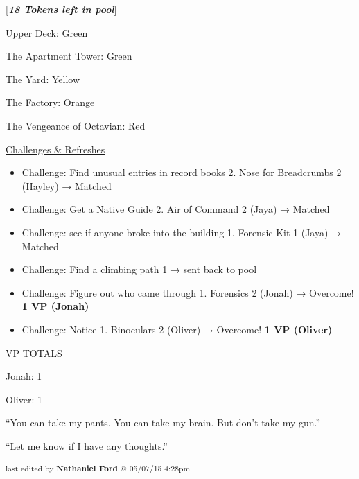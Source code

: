 {[}\textit{\textbf{18 Tokens left in pool}}{]}



Upper Deck: Green

The Apartment Tower: Green

The Yard: Yellow

The Factory: Orange

The Vengeance of Octavian: Red



\underline{  {\LARGE Challenges \& Refreshes }  }



\begin{itemize}
\item Challenge: Find unusual entries in record books 2.  Nose for Breadcrumbs 2 (Hayley) → Matched
\item Challenge: Get a Native Guide 2.  Air of Command 2 (Jaya) → Matched
\item Challenge: see if anyone broke into the building 1. Forensic Kit 1 (Jaya) → Matched
\item Challenge: Find a climbing path 1 → sent back to pool
\item Challenge: Figure out who came through 1.  Forensics 2 (Jonah) → Overcome! \textbf{1 VP (Jonah)}
\item Challenge: Notice 1.  Binoculars 2 (Oliver) → Overcome! \textbf{1 VP (Oliver)}
\end{itemize}



\underline{  {\LARGE VP TOTALS }  }

Jonah: 1

Oliver: 1



``You can take my pants.  You can take my brain.  But don't take my gun.''




``Let me know if I have any thoughts.''



\vspace{\fill}

\begin{flushright}
\textsubscript{last edited by \textbf{Nathaniel Ford} @ 05/07/15 4:28pm}
\end{flushright}

